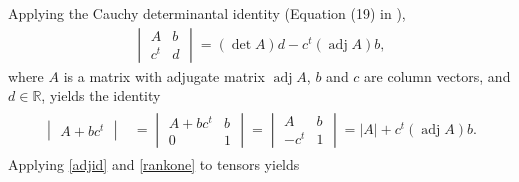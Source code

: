 \documentclass [leqno, 10pt]{amsart}
\theoremstyle{definition}
\numberwithin{equation}{section}
\newcommand{\adj}{\operatorname{adj}}
\newcommand{\rea}{\mathbb R}
\begin{document}
Applying the Cauchy determinantal identity (Equation (19) in \cite{Cauchy}),
\begin{align}\label{adjid}
\begin{vmatrix} A & b \\ c^{t} & d\end{vmatrix} = (\det A)d -c^{t}(\adj A)b,
\end{align}
where $A$ is a matrix with adjugate matrix $\adj A$, $b$ and $c$ are column vectors, and $d \in \rea$, yields the identity
\begin{align}\label{rankone}
\begin{split}
\begin{vmatrix} A + bc^{t}\end{vmatrix} & = \begin{vmatrix} A + bc^{t} & b \\ 0 & 1\end{vmatrix} = \begin{vmatrix} A & b \\ -c^{t} & 1\end{vmatrix}
= |A| + c^{t}(\adj A)b.
\end{split}
\end{align}
Applying \eqref{adjid} and \eqref{rankone} to tensors yields 
\end{document}
